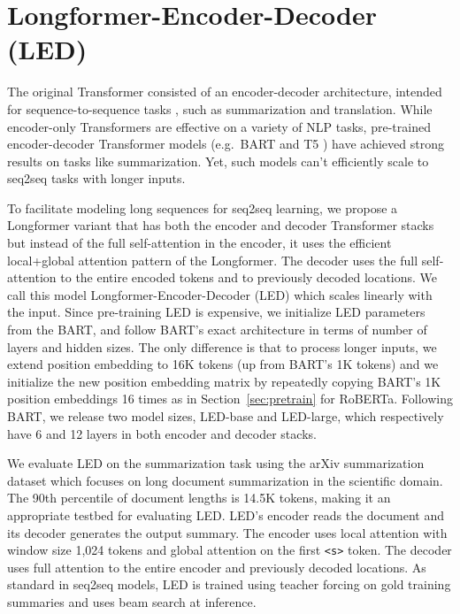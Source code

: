 \section{Longformer-Encoder-Decoder (LED)}
\label{sec:led}

The original Transformer \cite{Vaswani2017AttentionIA} consisted of an encoder-decoder architecture, intended for
sequence-to-sequence tasks \cite{Sutskever2014SequenceTS}, such as summarization and translation. 
While encoder-only Transformers are effective on a variety of NLP tasks, pre-trained encoder-decoder Transformer models
(e.g.\ BART \cite{lewis-etal-2020-bart} and T5 \cite{Raffel2020ExploringTL})
have achieved strong results on tasks like summarization. Yet, such models can't efficiently scale to seq2seq tasks with longer inputs.




To facilitate modeling long sequences for seq2seq learning, we propose a Longformer variant that has both the encoder and decoder Transformer stacks but instead of the full self-attention in the encoder, it uses the efficient local+global attention pattern of the Longformer.  The decoder uses the full self-attention to the entire encoded tokens and to previously decoded locations. We call this model Longformer-Encoder-Decoder (LED) which scales linearly with the input.
Since pre-training LED is expensive, we initialize LED parameters from the BART, and follow BART's exact architecture in terms of number of layers and hidden sizes. The only difference is that to process longer inputs, we extend position embedding to 16K tokens (up from BART's 1K tokens) and we initialize the new position embedding matrix by repeatedly copying BART's 1K position embeddings 16 times as in Section~\ref{sec:pretrain} for RoBERTa. Following BART, we release two model sizes, LED-base and LED-large, which respectively have 6 and 12 layers in both encoder and decoder stacks.


We evaluate LED on the summarization task using the arXiv summarization dataset \cite{arxiv2018} which focuses on long document summarization in the scientific domain. The 90th percentile of document lengths is 14.5K tokens, making it an appropriate testbed for evaluating LED. LED's encoder reads the document and its decoder generates the output summary. The encoder uses local attention with window size 1,024 tokens and global attention on the first \texttt{<s>} token. The decoder uses full attention to the entire encoder and previously decoded locations. As standard in seq2seq models, LED is trained using teacher forcing on gold training summaries and uses beam search at inference.


